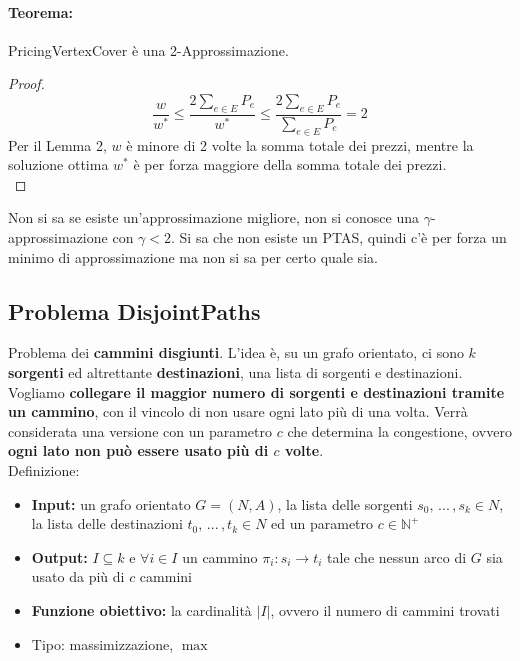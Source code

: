 \paragraph{Teorema:} PricingVertexCover è una 2-Approssimazione.\\

\begin{proof}
	$$ \frac{w}{w^\ast} \leq \frac{2 \sum_{e \in E} P_e}{w^\ast} \leq \frac{2 \sum_{e \in E} P_e}{\sum_{e \in E} P_e} = 2$$
	Per il Lemma 2, $w$ è minore di 2 volte la somma totale dei prezzi, mentre la soluzione ottima $w^\ast$ è per forza maggiore della somma totale dei prezzi. \\
\end{proof}

Non si sa se esiste un'approssimazione migliore, non si conosce una $\gamma$-approssimazione con $\gamma < 2$. Si sa che non esiste un PTAS, quindi c'è per forza un minimo di approssimazione ma non si sa per certo quale sia.\\

\newpage

\subsection{Problema DisjointPaths}

Problema dei \textbf{cammini disgiunti}. L'idea è, su un grafo orientato, ci sono $k$ \textbf{sorgenti} ed altrettante \textbf{destinazioni}, una lista di sorgenti e destinazioni. Vogliamo \textbf{collegare il maggior numero di sorgenti e destinazioni tramite un cammino}, con il vincolo di non usare ogni lato più di una volta. Verrà considerata una versione con un parametro $c$ che determina la congestione, ovvero \textbf{ogni lato non può essere usato più di $c$ volte}.\\

Definizione: 
\begin{itemize}
	\item \textbf{Input:} un grafo orientato $G = (N,A)$, la lista delle sorgenti $s_0, \, ... \, , s_k \in N$, la lista delle destinazioni $t_0, \, ... \, , t_k \in N$ ed un parametro $c \in \mathbb{N}^+$
	\item \textbf{Output:} $I \subseteq k$ e $\forall i \in I$ un cammino $\pi_i: s_i \rightarrow t_i$ tale che nessun arco di $G$ sia usato da più di $c$ cammini
	\item \textbf{Funzione obiettivo:} la cardinalità $|I|$, ovvero il numero di cammini trovati
	\item Tipo: massimizzazione, $\max$
\end{itemize}

